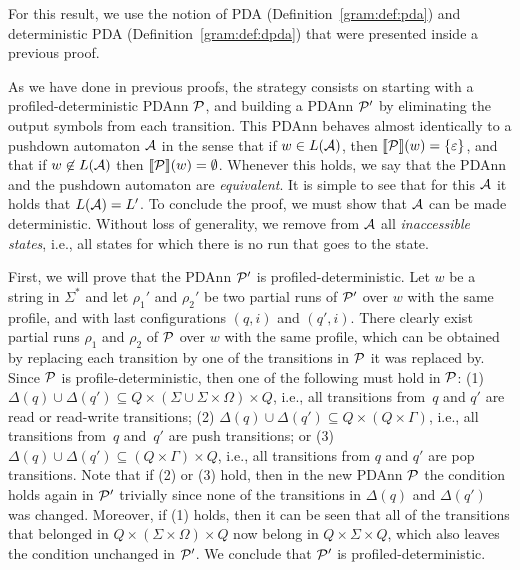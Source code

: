 
For this result, we use the notion of PDA (Definition~\ref{gram:def:pda}) and
deterministic PDA (Definition~\ref{gram:def:dpda}) that were presented inside a previous proof.

As we have done in previous proofs, the strategy consists on starting with a profiled-deterministic PDAnn $\mathcal{P}$, and building a PDAnn $\mathcal{P}'$ by eliminating the output symbols from each transition. This PDAnn behaves almost identically to a pushdown automaton $\mathcal{A}$ in the sense that if $w\in L(\mathcal{A})$,  then ${\llbracket{\mathcal{P}}\rrbracket}(w) = \{\varepsilon\}$, and that if $w\not\in L(\mathcal{A})$ then ${\llbracket{\mathcal{P}}\rrbracket}(w) = \emptyset$. Whenever this holds, we say that the PDAnn and the pushdown automaton are \emph{equivalent}. It is simple to see that for this $\mathcal{A}$ it holds that $L(\mathcal{A}) = L'$. To conclude the proof, we must show that $\mathcal{A}$ can be made deterministic. Without loss of generality, we remove from $\mathcal{A}$ 
%
all \emph{inaccessible states}, i.e., all states for which there is no run that goes to the state.

First, we will prove that the PDAnn $\mathcal{P}'$ is profiled-deterministic. Let $w$ be a string in $\Sigma^*$ and let $\rho_1'$ and $\rho_2'$ be two partial runs of $\mathcal{P}'$ over $w$ with the same profile, and with last configurations $(q, i)$ and $(q', i)$. There clearly exist partial runs $\rho_1$ and $\rho_2$ of $\mathcal{P}$ over $w$ with the same profile, which can be obtained by replacing each transition by one of the transitions in $\mathcal{P}$ it was replaced by. Since $\mathcal{P}$ is profile-deterministic, then one of the following must hold in $\mathcal{P}$: (1) $\Delta(q) \cup \Delta(q') \subseteq Q \times (\Sigma \cup \Sigma \times
\Omega) \times Q$, i.e., all transitions from~$q$ and $q'$ are read or
read-write transitions; (2) $\Delta(q) \cup \Delta(q') \subseteq Q \times (Q \times \Gamma)$, i.e.,
all transitions from~$q$ and~$q'$ are push transitions; or (3) $\Delta(q) \cup \Delta(q') \subseteq (Q \times \Gamma) \times Q$, i.e., 
all transitions from $q$ and $q'$ are pop transitions. Note that if (2) or (3) hold, then in the new PDAnn $\mathcal{P}$ the condition holds again in $\mathcal{P}'$ trivially since none of the transitions in $\Delta(q)$ and $\Delta(q')$ was changed. Moreover, if (1) holds, then it can be seen that all of the transitions that belonged in $Q\times (\Sigma\times\Omega)\times Q$ now belong in $Q\times \Sigma\times Q$, which also leaves the condition unchanged in $\mathcal{P}'$. We conclude that $\mathcal{P}'$ is profiled-deterministic.

